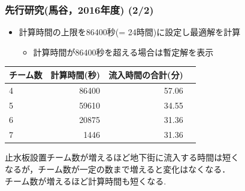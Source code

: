 \documentclass[12pt,dvipdfmx]{beamer}
\begin{document}
\frame
    {
      \frametitle{先行研究(馬谷，2016年度) (2/2)}

      \begin{itemize}
      \item 計算時間の上限を86400秒(= 24時間)に設定し最適解を計算
        \begin{itemize}
        \item 計算時間が86400秒を超える場合は暫定解を表示
        \end{itemize}
      \end{itemize}

      \begin{center}
      \begin{tabular}{lrrr}
        \hline
        チーム数 & 計算時間(秒) & 流入時間の合計(分) \\
        \hline
        4     & 86400 & 57.06\\
        5     & 59610 & 34.55\\
        6     & 20875 & 31.36\\
        7     & 1446 & 31.36\\
        \hline
      \end{tabular}
      \end{center}
      
      
      \begin{beamerboxesrounded}
        {}
        止水板設置チーム数が増えるほど地下街に流入する時間は短く\\なるが，チーム数が一定の数まで増えると変化はなくなる．\\チーム数が増えるほど計算時間も短くなる.
          

      \end{beamerboxesrounded}
      
    }
    
\end{document}
